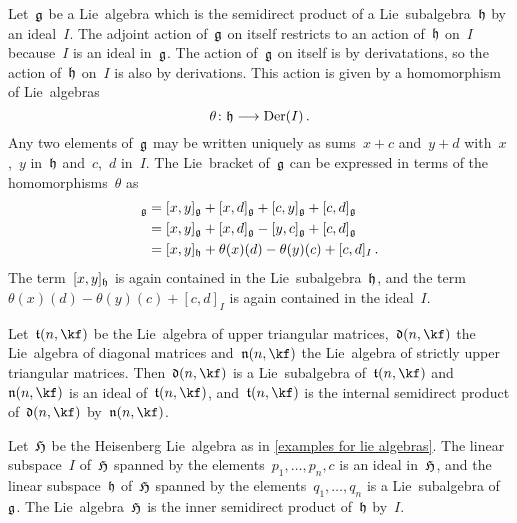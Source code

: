 \begin{fluff}
  \label{calculating structure of internal semidirect product}
  Let~$\mathfrak{g}$ be a Lie~algebra which is the semidirect product of a Lie~subalgebra~$\mathfrak{h}$ by an ideal~$I$.
  The adjoint action of~$\mathfrak{g}$ on itself restricts to an action of~$\mathfrak{h}$ on~$I$ because~$I$ is an ideal in~$\mathfrak{g}$.
  The action of~$\mathfrak{g}$ on itself is by derivatations, so the action of~$\mathfrak{h}$ on~$I$ is also by derivations.
  This action is given by a homomorphism of Lie~algebras
  \[
    \theta
    \colon
    \hlie
    \to
    \Der(I) \,.
  \]
  Any two elements of~$\mathfrak{g}$ may be written uniquely as sums~$x + c$ and~$y + d$ with~$x$,~$y$ in~$\mathfrak{h}$ and~$c$,~$d$ in~$I$.
  The Lie~bracket of~$\mathfrak{g}$ can be expressed in terms of the homomorphisms~$\theta$ as
  \begin{align*}
    [x + c, y + d]_{\glie}
    &=
    [x, y]_{\glie}
    + [x, d]_{\glie}
    + [c, y]_{\glie}
    + [c, d]_{\glie}
    \\
    &=
    [x, y]_{\glie}
    + [x, d]_{\glie}
    - [y, c]_{\glie}
    + [c, d]_{\glie}
    \\
    &=
    [x, y]_{\hlie}
    + \theta(x)(d)
    - \theta(y)(c)
    + [c, d]_I \,.
  \end{align*}
  The term~$[x,y]_{\mathfrak{h}}$ is again contained in the Lie~subalgebra~$\mathfrak{h}$, and the term~$\theta(x)(d) - \theta(y)(c) + [c,d]_I$ is again contained in the ideal~$I$.
\end{fluff}


\begin{example}
  Let~$\tlie(n, \kf)$ be the Lie~algebra of upper triangular matrices,~$\dlie(n, \kf)$ the Lie~algebra of diagonal matrices and~$\nlie(n, \kf)$ the Lie~algebra of strictly upper triangular matrices.
  Then~$\dlie(n, \kf)$ is a Lie~subalgebra of~$\tlie(n, \kf)$ and~$\nlie(n, \kf)$ is an ideal of~$\tlie(n, \kf)$, and~$\tlie(n, \kf)$ is the internal semidirect product of~$\dlie(n, \kf)$ by~$\nlie(n, \kf)$.
\end{example}


\begin{example}
  Let~$\mathfrak{H}$ be the Heisenberg Lie~algebra as in \cref{examples for lie algebras}.
  The linear subspace~$I$ of~$\mathfrak{H}$ spanned by the elements~$p_1, \dotsc, p_n, c$ is an ideal in~$\mathfrak{H}$, and the linear subspace~$\mathfrak{h}$ of~$\mathfrak{H}$ spanned by the elements~$q_1, \dotsc, q_n$ is a Lie~subalgebra of~$\mathfrak{g}$.
  The Lie~algebra~$\mathfrak{H}$ is the inner semidirect product of~$\mathfrak{h}$ by~$I$.
\end{example}

